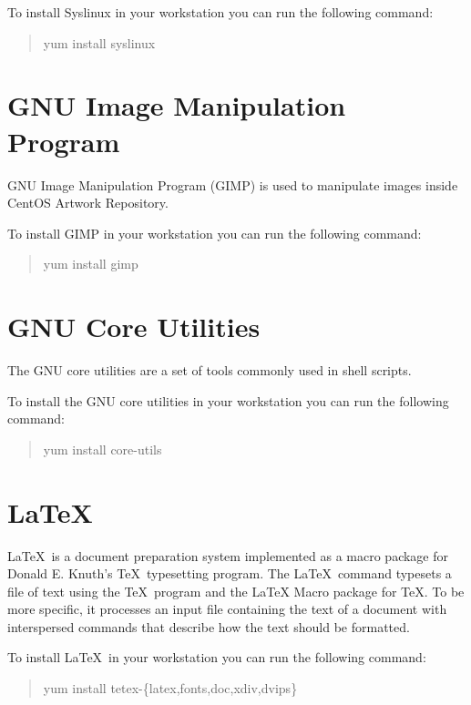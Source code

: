 To install Syslinux in your workstation you can run the following
command:

\begin{quote}
yum install syslinux
\end{quote}

\section{GNU Image Manipulation Program}

GNU Image Manipulation Program (GIMP) is used to manipulate images
inside CentOS Artwork Repository.  

To install GIMP in your workstation you can run the following command:

\begin{quote}
yum install gimp
\end{quote}

\section{GNU Core Utilities}

The GNU core utilities are a set of tools commonly used in shell
scripts.

To install the GNU core utilities in your workstation you can run the
following command:

\begin{quote}
yum install core-utils
\end{quote}

\section{\LaTeX}

\LaTeX\ is a document preparation system implemented as a macro
package for Donald E.  Knuth's \TeX\ typesetting program. The \LaTeX\
command typesets a file of text using the \TeX\ program and the LaTeX
Macro package for \TeX.  To be more specific, it processes an input
file containing the text of a document with interspersed commands that
describe how the text should be formatted. 

To install \LaTeX\ in your workstation you can run the following
command:

\begin{quote}
yum install tetex-\{latex,fonts,doc,xdiv,dvips\}
\end{quote}
